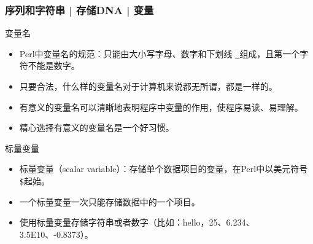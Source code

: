 \begin{frame}[fragile]
  \frametitle{序列和字符串 | 存储DNA | \alert{变量}}
  \begin{block}{变量名}
  \begin{itemize}
    \item Perl中变量名的规范：只能由大小写字母、数字和下划线 \verb|_|组成，且第一个字符不能是数字。
    \item 只要合法，什么样的变量名对于计算机来说都无所谓，都是一样的。
    \item 有意义的变量名可以清晰地表明程序中变量的作用，使程序易读、易理解。
    \item 精心选择有意义的变量名是一个好习惯。
  \end{itemize}
  \end{block}
  \pause
  \begin{block}{标量变量}
    \begin{itemize}
      \item 标量变量（scalar variable）：存储单个数据项目的变量，在Perl中以美元符号 \verb|$|起始。
      \item 一个标量变量一次只能存储数据中的一个项目。
      \item 使用标量变量存储字符串或者数字（比如：hello，25、6.234、3.5E10、-0.8373）。
    \end{itemize}
  \end{block}
\end{frame}

